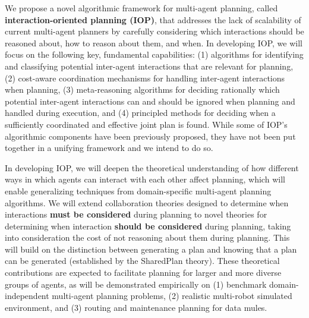 \documentclass[11pt]{article}
\begin{document}
We propose a novel algorithmic framework for multi-agent planning, called {\bf interaction-oriented planning (IOP)}, that addresses the lack of scalability of current multi-agent planners by carefully considering which interactions should be reasoned about, how to reason about them, and when. In developing IOP, we will focus on  the following key, fundamental capabilities: 
(1) algorithms for identifying and classifying potential inter-agent interactions that are relevant for planning,
(2) cost-aware coordination mechanisms for handling inter-agent interactions when planning,
(3) meta-reasoning algorithms for deciding rationally which potential inter-agent interactions can and should be ignored when planning and handled during execution, and (4) principled methods for deciding when a sufficiently coordinated and effective joint plan is found. 
While some of IOP's algorithmic components have been previously proposed, they have not been put together in a unifying framework and we intend to do so.

 

In developing IOP, we will deepen the theoretical understanding of how different ways in which agents can interact with each other affect planning, which will enable generalizing techniques from domain-specific multi-agent planning algorithms. We will extend collaboration theories designed to determine when interactions {\bf must be considered} during planning to novel theories for determining when interaction {\bf should be considered} during planning, taking into consideration the cost of not reasoning about them during planning. This will build on the distinction between generating a plan and knowing that a plan can be generated (established by the SharedPlan theory). These theoretical contributions are expected to facilitate planning for larger and more diverse groups of agents, as will be demonstrated empirically on (1) benchmark domain-independent multi-agent planning problems, (2) realistic multi-robot simulated environment, and (3) routing and maintenance planning for data mules. %





\end{document}
